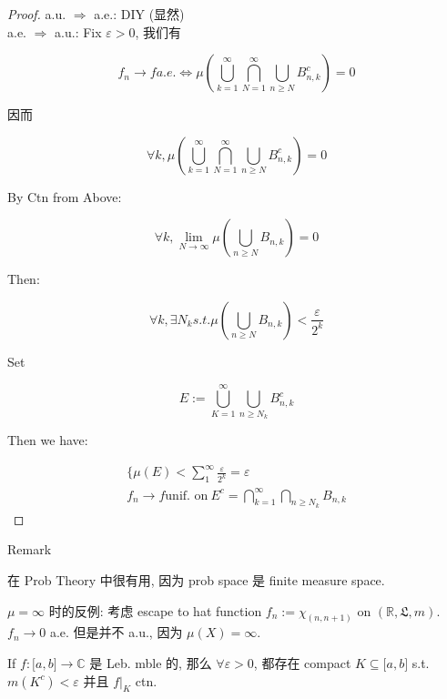 \begin{proof}

a.u. \(\Longrightarrow\) a.e.: DIY (显然)\\
a.e. \(\Longrightarrow\) a.u.: Fix \(\varepsilon > 0\), 我们有

\[f_{n}\rightarrow f a.e.\Leftrightarrow\mu(\bigcup\limits_{k = 1}^{\infty}\bigcap\limits_{N = 1}^{\infty}\bigcup\limits_{n \geq N}B_{n,k}^{c}) = 0\]

因而

\[\forall k,\mu(\bigcup\limits_{k = 1}^{\infty}\bigcap\limits_{N = 1}^{\infty}\bigcup\limits_{n \geq N}B_{n,k}^{c}) = 0\]

By Ctn from Above:

\[\forall k,\lim\limits_{N\rightarrow\infty}\mu(\bigcup\limits_{n \geq N}B_{n,k}) = 0\]

Then:

\[\forall k,\exists N_{k} s.t.\mu(\bigcup\limits_{n \geq N}B_{n,k}) < \frac{\varepsilon}{2^{k}}\]

Set

\[E := \bigcup\limits_{K = 1}^{\infty}\bigcup\limits_{n \geq N_{k}}B_{n,k}^{c}\]

Then we have:

\[\begin{matrix}
{\{\mu(E) < \sum\limits_{1}^{\infty}\frac{\varepsilon}{2^{k}} = \varepsilon} \\
{f_{n}\rightarrow f\text{unif. on}\ E^{c} = \bigcap\limits_{k = 1}^{\infty}\bigcap\limits_{n \geq N_{k}}B_{n,k}}
\end{matrix}\]

\end{proof}

\begin{qlremark}{Remark}

在 Prob Theory 中很有用, 因为 prob space 是 finite measure space.

\end{qlremark}

\begin{example}

\(\mu = \infty\) 时的反例: 考虑 escape to hat function \(f_{n} := \chi_{(n,n + 1)}\) on \((\mathbb{R},\mathfrak{L},m)\).\\
\(f_{n}\rightarrow 0\) a.e. 但是并不 a.u., 因为 \(\mu(X) = \infty\).

\end{example}

\begin{theorem}{}

If \(f:\lbrack a,b\rbrack\rightarrow\mathbb{C}\) 是 Leb. mble 的, 那么 \(\forall\varepsilon > 0\), 都存在 compact \(K \subseteq \lbrack a,b\rbrack\) s.t. \(m(K^{c}) < \varepsilon\) 并且 \(f|_{K}\) ctn.

\end{theorem}

